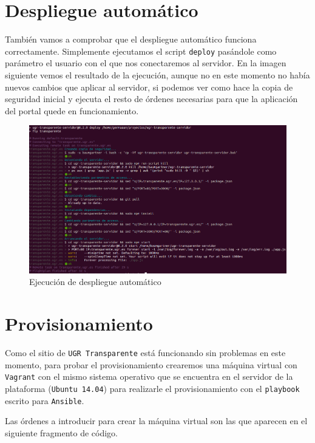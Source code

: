 \section{Despliegue automático}

También vamos a comprobar que el despliegue automático funciona correctamente. Simplemente ejecutamos el script {\tt deploy} pasándole como parámetro el usuario con el que nos conectaremos al servidor. En la imagen siguiente vemos el resultado de la ejecución, aunque no en este momento no había nuevos cambios que aplicar al servidor, si podemos ver como hace la copia de seguridad inicial y ejecuta el resto de órdenes necesarias para que la aplicación del portal quede en funcionamiento.

\begin{figure}[!ht]
	\begin{center}
		\includegraphics[width=1\textwidth]{../images/deploy.png}
		\caption{Ejecución de despliegue automático}
		\label{fig:deploy}
	\end{center}
\end{figure}

\newpage
\section{Provisionamiento}

Como el sitio de {\tt UGR Transparente} está funcionando sin problemas en este momento, para probar el provisionamiento crearemos una máquina virtual con {\tt Vagrant} con el mismo sistema operativo que se encuentra en el servidor de la plataforma ({\tt Ubuntu 14.04}) para realizarle el provisionamiento con el {\tt playbook} escrito para {\tt Ansible}.

\bigskip
Las órdenes a introducir para crear la máquina virtual son las que aparecen en el siguiente fragmento de código.

